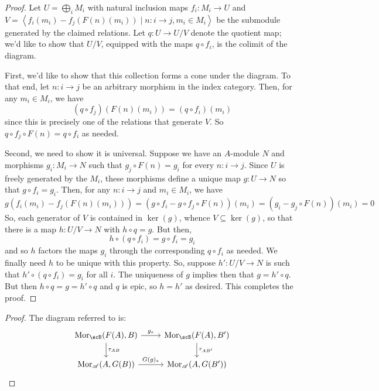 \documentclass[12pt]{exam}
\begin{document}
\begin{proof}
	Let $U = \bigoplus_i M_i$ with natural inclusion maps $f_i : M_i \to U$ and $V = \left<f_i(m_i)-f_j(F(n)(m_i)) \mid n : i \to j, m_i \in M_i\right>$ be the submodule generated by the claimed relations. Let $q : U \to U/V$ denote the quotient map; we'd like to show that $U/V$, equipped with the maps $q \circ f_i$, is the colimit of the diagram.
	
	First, we'd like to show that this collection forms a cone under the diagram. To that end, let $n : i \to j$ be an arbitrary morphism in the index category. Then, for any $m_i \in M_i$, we have
	\[ (q \circ f_j)(F(n)(m_i)) = (q \circ f_i)(m_i) \]
	since this is precisely one of the relations that generate $V$. So $q \circ f_j \circ F(n) = q \circ f_i$ as needed.
	
	Second, we need to show it is universal. Suppose we have an $A$-module $N$ and morphisms $g_i : M_i \to N$ such that $g_j \circ F(n) = g_i$ for every $n : i \to j$. Since $U$ is freely generated by the $M_i$, these morphisms define a unique map $g : U \to N$ so that $g \circ f_i = g_i$. Then, for any $n : i \to j$ and $m_i \in M_i$, we have
	\[ g(f_i(m_i)-f_j(F(n)(m_i))) = (g \circ f_i - g \circ f_j \circ F(n))(m_i) = (g_i - g_j \circ F(n))(m_i) = 0 \]
	So, each generator of $V$ is contained in $\ker(g)$, whence $V \subseteq \ker(g)$, so that there is a map $h : U/V \to N$ with $h \circ q = g$. But then,
	\[ h \circ (q \circ f_i) = g \circ f_i = g_i \]
	and so $h$ factors the maps $g_i$ through the corresponding $q \circ f_i$ as needed. We finally need $h$ to be unique with this property. So, suppose $h' : U/V \to N$ is such that $h' \circ (q \circ f_i) = g_i$ for all $i$. The uniqueness of $g$ implies then that $g = h' \circ q$. But then $h \circ q = g = h' \circ q$ and $q$ is epic, so $h = h'$ as desired. This completes the proof.
\end{proof}

\begin{proof}
	The diagram referred to is:
	\[ \begin{tikzcd} \Mor_\scB(F(A),B) \arrow[r,"g_\ast"] \arrow[d,"\tau_{AB}"] & \Mor_\scB(F(A),B') \arrow[d,"\tau_{AB'}"] \\ \Mor_\scA(A,G(B)) \arrow[r,"G(g)_\ast"] & \Mor_\scA(A,G(B')) \end{tikzcd} \]
\end{proof}
\end{document}
